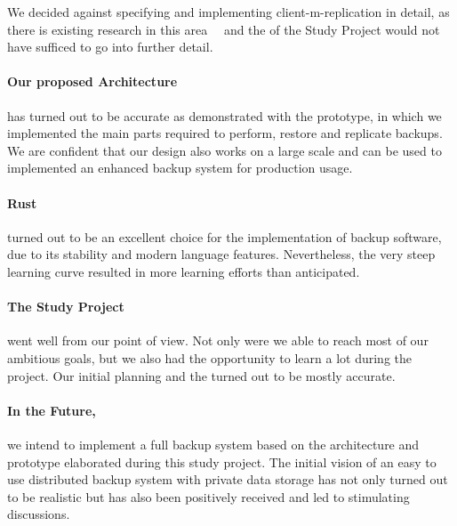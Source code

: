 We decided against specifying and implementing \gls{client-m-replication} in detail, as there is existing research in this area~\cite{p2p-redundancy}~\cite{p2p-scheduling} and the  of the Study Project would not have sufficed to go into further detail.

\paragraph{Our proposed Architecture}
has turned out to be accurate as demonstrated with the prototype, in which we implemented the main parts required to perform, restore and replicate backups. We are confident that our design also works on a large scale and can be used to implemented an enhanced backup system for production usage.

\paragraph{Rust}
turned out to be an excellent choice for the implementation of backup software, due to its stability and modern language features.
Nevertheless, the very steep learning curve resulted in more learning efforts than anticipated.

\paragraph{The Study Project}
went well from our point of view. Not only were we able to reach most of our ambitious goals, but we also had the opportunity to learn a lot during the project. Our initial planning and the  turned out to be mostly accurate.

\paragraph{In the Future,}
we intend to implement a full backup system based on the architecture and prototype elaborated during this study project. The initial vision of an easy to use distributed backup system with private data storage has not only turned out to be realistic but has also been positively received and led to stimulating discussions.
